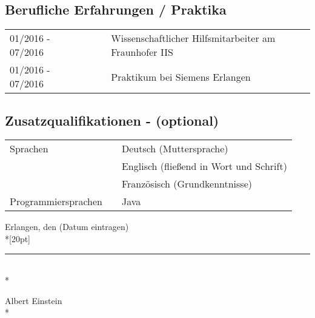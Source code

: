 \subsection*{Berufliche Erfahrungen / Praktika}
\begin{tabular}{lcl}
01/2016 - 07/2016     & ~~~ &  Wissenschaftlicher Hilfsmitarbeiter am Fraunhofer IIS\\
01/2016 - 07/2016     & ~~~ &  Praktikum bei Siemens Erlangen\\
\end{tabular}
\subsection*{Zusatzqualifikationen - (optional)}
\begin{tabular}{lcl}
Sprachen            &  & Deutsch (Muttersprache)\\
                    &  & Englisch (fließend in Wort und Schrift)\\
                    &  & Französisch (Grundkenntnisse)\\[5pt]
Programmiersprachen &  & Java \\
\end{tabular} 
\bigskip
\vspace*{.5cm}




Erlangen, den (Datum eintragen)\\*[20pt]\nopagebreak
\vspace{0.5cm}


\rule{5cm}{0.4pt}\\*\nopagebreak


Albert Einstein\\*\nopagebreak



